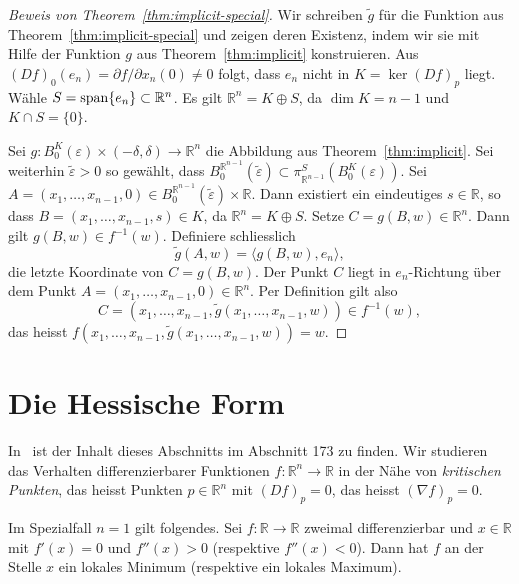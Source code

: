 \documentclass[../main.tex]{subfiles}
\begin{document}
\begin{proof}[Beweis von Theorem~\ref{thm:implicit-special}]
  Wir schreiben $\widetilde g$ für die Funktion aus 
  Theorem~\ref{thm:implicit-special}
  und zeigen deren Existenz, indem wir sie mit Hilfe der Funktion
  $g$ aus Theorem~\ref{thm:implicit} konstruieren.
  Aus ${(Df)}_0(e_n) = \partial f / \partial x_n ( 0 ) \neq 0$
  folgt, dass  $e_n$ nicht in $K = \ker {(Df)}_p$ liegt.
  Wähle $S = \operatorname{span} \{ e_n \} \subset \mathbb{R}^n$.
  Es gilt $\mathbb{R}^n = K \oplus S$, da
  $\dim K = n-1$ und $K \cap S = \{0\}$.

  Sei $g \colon B_0^K(\varepsilon) \times (-\delta, \delta) \to
  \mathbb{R}^n$ die Abbildung aus  Theorem~\ref{thm:implicit}.
  Sei 
  weiterhin $\widetilde \varepsilon > 0$ so gewählt, dass
  $B_0^{\mathbb{R}^{n-1}}(\widetilde \varepsilon)
  \subset \pi_{\mathbb{R}^{n-1}}^S(B_0^K(\varepsilon))$.
  Sei $A = (x_1, \dots, x_{n-1}, 0) \in B_0^{\mathbb{R}^{n-1}}(\widetilde
  \varepsilon) \times \mathbb{R}$.
  Dann existiert ein eindeutiges $s \in \mathbb{R}$, so dass
  $B = (x_1, \dots, x_{n-1}, s) \in K$,
  da $\mathbb{R}^{n} = K \oplus S$.
  Setze $C = g(B, w) \in \mathbb{R}^n$.
  Dann gilt $g(B, w) \in f^{-1}(w)$.
  Definiere schliesslich 
  \[\widetilde g (A, w) = \langle g(B, w), e_n \rangle,\]
  die letzte Koordinate von $C = g(B, w)$.
  Der Punkt $C$ liegt in $e_n$-Richtung über dem Punkt $A
  = (x_1, \dots, x_{n-1}, 0) \in \mathbb{R}^n$.
  Per Definition gilt also
  \[
  C = (x_1, \dots, x_{n-1}, \widetilde g(x_1, \dots, x_{n-1}, w))
  \in f^{-1}(w),
  \] 
  das heisst 
  $f(x_1, \dots, x_{n-1}, \widetilde g(x_1, \dots, x_{n-1}, w)) = w$.
\end{proof}

\section{Die Hessische Form}
In~\cite{heuser} ist der Inhalt dieses Abschnitts im Abschnitt 173
zu finden.
Wir studieren das Verhalten differenzierbarer Funktionen
$f \colon\mathbb{R}^n \to \mathbb{R}$
in der Nähe von \emph{kritischen Punkten},
das heisst Punkten $p \in \mathbb{R}^n$ 
mit ${(Df)}_p = 0$, das heisst  ${(\nabla f)}_p = 0$.

Im Spezialfall
$n = 1$ 
gilt folgendes. Sei $f \colon \mathbb{R} \to \mathbb{R}$ 
zweimal differenzierbar und $x \in \mathbb{R}$ 
mit $f'(x) = 0$ und $f''(x) > 0$ (respektive $f''(x) < 0$).
Dann hat $f$ an der Stelle $x$ ein lokales Minimum
(respektive ein lokales Maximum).
\end{document}
